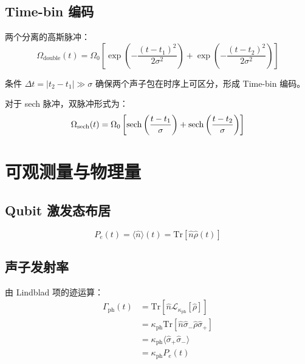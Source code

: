 \documentclass[12pt,a4paper]{article}
\theoremstyle{definition}
\begin{document}
\subsection{Time-bin 编码}

两个分离的高斯脉冲：
\begin{equation}
    \Omega_{\text{double}}(t) = \Omega_0\left[\exp\left(-\frac{(t-t_1)^2}{2\sigma^2}\right) + \exp\left(-\frac{(t-t_2)^2}{2\sigma^2}\right)\right]
    \label{eq:double_pulse}
\end{equation}

条件 $\Delta t = |t_2 - t_1| \gg \sigma$ 确保两个声子包在时序上可区分，形成 Time-bin 编码。

对于 sech 脉冲，双脉冲形式为：
\begin{equation}
    \Omega_{\text{sech}}(t) = \Omega_0\left[\sech\left(\frac{t-t_1}{\sigma}\right) + \sech\left(\frac{t-t_2}{\sigma}\right)\right]
    \label{eq:double_sech_pulse}
\end{equation}

\section{可观测量与物理量}

\subsection{Qubit 激发态布居}

\begin{equation}
    P_e(t) = \langle\hat{n}\rangle(t) = \text{Tr}[\hat{n}\hat{\rho}(t)]
    \label{eq:excited_population}
\end{equation}

\subsection{声子发射率}

由 Lindblad 项的迹运算：
\begin{align}
    \Gamma_{\text{ph}}(t) &= \text{Tr}[\hat{n}\mathcal{L}_{\kappa_{\text{ph}}}[\hat{\rho}]] \nonumber\\
    &= \kappa_{\text{ph}}\text{Tr}[\hat{n}\hat{\sigma}_-\hat{\rho}\hat{\sigma}_+] \nonumber\\
    &= \kappa_{\text{ph}}\langle\hat{\sigma}_+\hat{\sigma}_-\rangle \nonumber\\
    &= \kappa_{\text{ph}} P_e(t)
    \label{eq:phonon_emission_rate}
\end{align}
\end{document}
